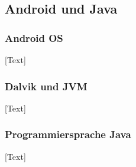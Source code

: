 
\subsection{Android und Java}

\subsubsection{Android OS}
[Text]

\subsubsection{Dalvik und JVM}
[Text]

\subsubsection{Programmiersprache Java}
[Text]


